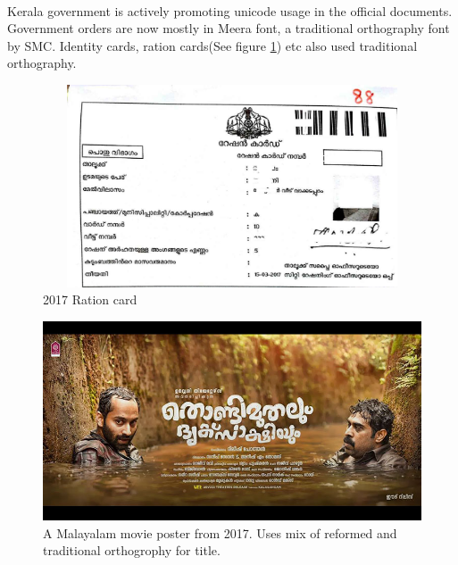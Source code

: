 \documentclass[10pt]{article}
\begin{document}


\paragraph{}
Kerala government is actively promoting unicode usage in the official documents. Government orders are now mostly in Meera font, a traditional orthography font by SMC. Identity cards, ration cards(See figure \ref{rationcard}) etc also used traditional orthography.

\begin{figure}[H]
 \centering
  \includegraphics[width=1.0\textwidth,height=6cm ]{images/2017-rationcard.jpg}
   \caption{2017 Ration card}
  \label{rationcard}
\end{figure}


\begin{figure}[H]
 \centering
  \includegraphics[width=1.0\textwidth]{images/2017-movieposter-Thondimuthal}
 \caption{A Malayalam movie poster from 2017. Uses mix of reformed and traditional orthogrophy for title.}
\end{figure}
\end{document}
